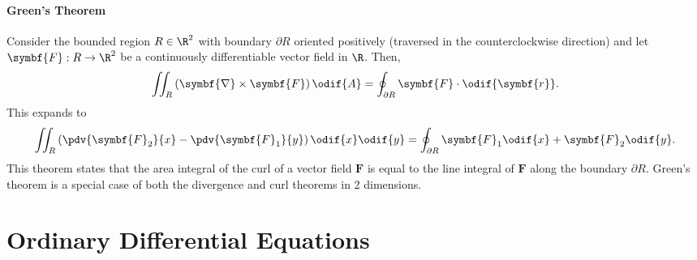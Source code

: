 \documentclass{article}
\begin{document}
\subsection{Green's Theorem}
Consider the bounded region \(R \in \R^2\) with boundary \(\partial R\)
oriented positively (traversed in the counterclockwise direction) and
let \(\symbf{F}:R \to \R^2\) be a continuously differentiable vector
field in \(\R\). Then,
\begin{equation*}
    \iint_R \left( \symbf{\nabla} \times \symbf{F} \right) \odif{A} = \oint_{\partial R} \symbf{F} \cdot \odif{\symbf{r}}.
\end{equation*}
This expands to
\begin{equation*}
    \iint_R \left( \pdv{\symbf{F}_2}{x} - \pdv{\symbf{F}_1}{y} \right) \odif{x} \odif{y} = \oint_{\partial R} \symbf{F}_1 \odif{x} + \symbf{F}_2 \odif{y}.
\end{equation*}
This theorem states that the area integral of the curl of a vector field
\(\symbf{F}\) is equal to the line integral of \(\symbf{F}\) along the
boundary \(\partial R\). Green's theorem is a special case of both the
divergence and curl theorems in 2 dimensions.
\part{Ordinary Differential Equations}
\end{document}
